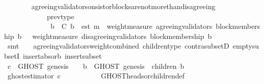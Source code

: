 \begin{isabellebody}
\ \ \ \ \ \ \isamarkupfalse%
\ agreeing{\isacharunderscore}validators{\isacharunderscore}on{\isacharunderscore}sistor{\isacharunderscore}blocks{\isacharunderscore}are{\isacharunderscore}not{\isacharunderscore}more{\isacharunderscore}than{\isacharunderscore}disagreeing\ \isanewline
\ \ \ \ \ \ \ \ \ \ \ \ prev{\isacharunderscore}type\ \isanewline
\ \ \ \ \ \ \ \ \ \ \ \ {\isacartoucheopen}{\isasymforall}\ b{\isacharprime}\ {\isasymin}\ C{\isachardot}\ b{\isacharprime}\ {\isasymdownharpoonright}\ est\ m\ {\isasymlongrightarrow}\ weight{\isacharunderscore}measure\ {\isacharparenleft}agreeing{\isacharunderscore}validators\ {\isacharparenleft}block{\isacharunderscore}membership\ b{\isacharprime}{\isacharcomma}\ {\isasymsigma}{\isacharprime}{\isacharparenright}{\isacharparenright}\ {\isachargreater}\ weight{\isacharunderscore}measure\ {\isacharparenleft}disagreeing{\isacharunderscore}validators\ {\isacharparenleft}block{\isacharunderscore}membership\ b{\isacharprime}{\isacharcomma}\ {\isasymsigma}{\isacharprime}{\isacharparenright}{\isacharparenright}{\isacartoucheclose}\isanewline
\ \ \ \ \ \ \isamarkupfalse%
\ {\isacharparenleft}smt\ {\isacartoucheopen}{\isasymsigma}{\isacharprime}\ {\isasymin}\ {\isasymSigma}{\isacartoucheclose}\ agreeing{\isacharunderscore}validators{\isacharunderscore}weight{\isacharunderscore}combined\ children{\isacharunderscore}type\ contra{\isacharunderscore}subsetD\ empty{\isacharunderscore}subsetI\ insert{\isacharunderscore}absorb{}\ insert{\isacharunderscore}subset{\isacharparenright}\ \ \ \ \ \ \isanewline
\ \ \ \ \isamarkupfalse%
\ {\isachardoublequoteopen}c\ {\isasymin}\ GHOST\ {\isacharparenleft}{\isacharbraceleft}genesis{\isacharbraceright}{\isacharcomma}\ {\isasymsigma}{\isacharprime}{\isacharparenright}\ {\isasymunion}\ {\isacharparenleft}{\isasymUnion}\ b\ {\isasymin}\ GHOST\ {\isacharparenleft}{\isacharbraceleft}genesis{\isacharbraceright}{\isacharcomma}\ {\isasymsigma}{\isacharprime}{\isacharparenright}{\isachardot}\ children\ {\isacharparenleft}b{\isacharcomma}\ {\isasymsigma}{\isacharprime}{\isacharparenright}{\isacharparenright}{\isachardoublequoteclose}\ \isanewline
\ \ \ \ \ \ \isamarkupfalse%
\ ghost{\isacharunderscore}estimator\ {\isacartoucheopen}c\ {\isasymin}\ {\isasymepsilon}\ {\isasymsigma}{\isacharprime}{\isacartoucheclose}\isanewline
\ \ \ \ \ \ \isamarkupfalse%
\ GHOST{\isacharunderscore}heads{\isacharunderscore}or{\isacharunderscore}children{\isacharunderscore}def\isanewline
\ \ \ \ \ \ \isamarkupfalse%

\end{isabellebody}
